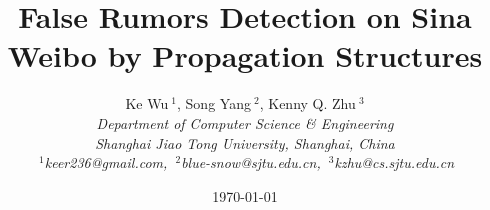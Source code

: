 \documentclass[10pt,final,conference,letterpaper]{IEEEtran}
\begin{document}
\title{False Rumors Detection on Sina Weibo by Propagation Structures
}

\author{
Ke Wu{\small $~^{1}$}, Song Yang{\small $~^{2}$},
Kenny Q. Zhu{\small $~^{3}$}
\vspace{1.6mm}\\
\fontsize{10}{10}\selectfont\itshape
Department of Computer Science \& Engineering\\
Shanghai Jiao Tong University, Shanghai, China\\
\fontsize{9}{9}\selectfont\ttfamily\upshape
$~^{1}$keer236@gmail.com, $~^{2}$blue-snow@sjtu.edu.cn,
$~^{3}$kzhu@cs.sjtu.edu.cn
}

\date{\today}
\maketitle









\end{document}
